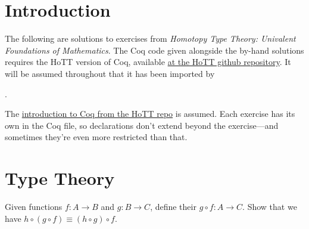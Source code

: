 \begin{coqdoccode}
\end{coqdoccode}


\section*{Introduction}


The following are solutions to exercises from
\textit{Homotopy Type Theory: Univalent Foundations of Mathematics}.  The Coq
code given alongside the by-hand solutions requires the HoTT version of Coq,
available \href{https://github.com/HoTT}{at the HoTT github repository}.  It
will be assumed throughout that it has been imported by \begin{coqdoccode}
\coqdocemptyline
\coqdocnoindent
{}  .\coqdoceol
\coqdocemptyline
\end{coqdoccode}
\noindent
The
\href{https://github.com/HoTT/book/blob/master/coq_introduction/Reading_HoTT_in_Coq.v}{introduction to Coq from the HoTT repo} 
is assumed.  Each exercise has its own  in the Coq file, so 
declarations don't extend beyond the exercise---and sometimes they're even more
restricted than that.


\section{Type Theory}

\begin{coqdoccode}
\coqdocemptyline
\end{coqdoccode}
Given functions $f:A\to B$ and $g:B\to C$, define their  
$g \circ f : A \to C$.  Show that we have $h \circ (g \circ f) \equiv (h \circ g) \circ f$.


